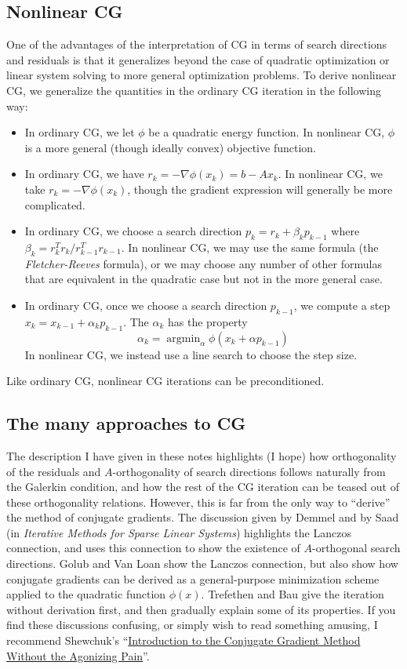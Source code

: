 \subsection{Nonlinear CG}

One of the advantages of the interpretation of CG in terms of search
directions and residuals is that it generalizes beyond the case of
quadratic optimization or linear system solving to more general
optimization problems.  To derive nonlinear CG, we generalize the
quantities in the ordinary CG iteration in the following way:
\begin{itemize}
\item
  In ordinary CG, we let $\phi$ be a quadratic energy function.
  In nonlinear CG, $\phi$ is a more general (though ideally
  convex) objective function.
\item
  In ordinary CG, we have $r_k = -\nabla \phi(x_k) = b-Ax_k$.
  In nonlinear CG, we take $r_k = -\nabla \phi(x_k)$, though the
  gradient expression will generally be more complicated.
\item
  In ordinary CG, we choose a search direction $p_k = r_k + \beta_k p_{k-1}$
  where $\beta_k = r_k^T r_k / r_{k-1}^T r_{k-1}$.  In nonlinear CG,
  we may use the same formula (the {\em Fletcher-Reeves} formula),
  or we may choose any number of other formulas that are equivalent
  in the quadratic case but not in the more general case.
\item
  In ordinary CG, once we choose a search direction $p_{k-1}$, we compute
  a step $x_k = x_{k-1} + \alpha_{k} p_{k-1}$.  The $\alpha_k$ has
  the property
  \[
    \alpha_k = \operatorname{argmin}_{\alpha} \phi(x_k + \alpha p_{k-1})
  \]
  In nonlinear CG, we instead use a line search to choose the step size.
\end{itemize}
Like ordinary CG, nonlinear CG iterations can be preconditioned.

\subsection{The many approaches to CG}

The description I have given in these notes highlights (I hope)
how orthogonality of the residuals and $A$-orthogonality
of search directions follows naturally from the Galerkin condition,
and how the rest of the CG iteration can be teased out of these
orthogonality relations.  However, this is far from the only way
to ``derive'' the method of conjugate gradients.  The discussion
given by Demmel and by Saad
(in {\em Iterative Methods for Sparse Linear Systems})
highlights the Lanczos connection, and uses this connection to
show the existence of $A$-orthogonal search directions.
Golub and Van Loan show the Lanczos connection, but also show
how conjugate gradients can be derived as a general-purpose minimization
scheme applied to the quadratic function $\phi(x)$.  Trefethen and Bau
give the iteration without derivation first, and then gradually explain
some of its properties.  If you find these discussions confusing,
or simply wish to read something amusing, I recommend Shewchuk's
``\href{http://www.cs.cmu.edu/~quake-papers/painless-conjugate-gradient.pdf}{Introduction to the Conjugate Gradient Method Without the Agonizing Pain}''.
